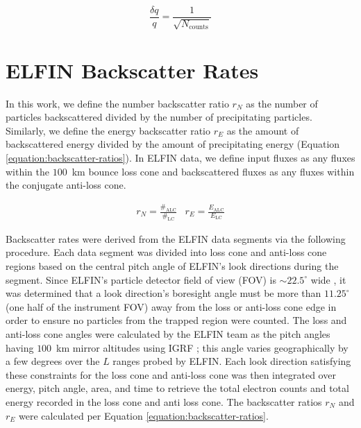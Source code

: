 \documentclass[draft]{agujournal2019}
\newcommand{\mathdeg}{^\circ}
\begin{document}
\begin{equation}
  \label{equation:relative-error}
  \frac{\delta q}{q} = \frac{1}{\sqrt{N_\text{counts}}}
\end{equation}


\section{ELFIN Backscatter Rates} \label{section:data-backscatter}
In this work, we define the number backscatter ratio $r_N$ as the number of particles backscattered divided by the number of precipitating particles. Similarly, we define the energy backscatter ratio $r_E$ as the amount of backscattered energy divided by the amount of precipitating energy (Equation \ref{equation:backscatter-ratios}). In ELFIN data, we define input fluxes as any fluxes within the $100$~km bounce loss cone and backscattered fluxes as any fluxes within the conjugate anti-loss cone.

\begin{align}
  \label{equation:backscatter-ratios}
  & r_{N} = \frac{\#_\text{ALC}}{\#_\text{LC}} & r_{E} = \frac{E_\text{ALC}}{E_\text{LC}} &
\end{align}

Backscatter rates were derived from the ELFIN data segments via the following procedure. Each data segment was divided into loss cone and anti-loss cone regions based on the central pitch angle of ELFIN's look directions during the segment. Since ELFIN's particle detector field of view (FOV) is $\sim 22.5\mathdeg$ wide \cite{angelopoulos2020}, it was determined that a look direction's boresight angle must be more than $11.25\mathdeg$ (one half of the instrument FOV) away from the loss or anti-loss cone edge in order to ensure no particles from the trapped region were counted. The loss and anti-loss cone angles were calculated by the ELFIN team as the pitch angles having $100$~km mirror altitudes using IGRF \cite{angelopoulos2020, tsai-email}; this angle varies geographically by a few degrees over the $L$ ranges probed by ELFIN. Each look direction satisfying these constraints for the loss cone and anti-loss cone was then integrated over energy, pitch angle, area, and time to retrieve the total electron counts and total energy recorded in the loss cone and anti loss cone. The backscatter ratios $r_N$ and $r_E$ were calculated per Equation \ref{equation:backscatter-ratios}.
\end{document}
